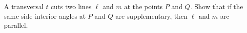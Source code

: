 A transversal $t$ cuts two lines $\ell$ and $m$ at the points $P$ and $Q$. Show that if the same-side interior angles at $P$ and $Q$ are supplementary, then $\ell$ and $m$ are parallel.
